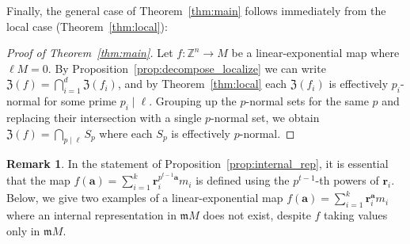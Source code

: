\documentclass[letterpaper, 11pt, thm-restate]{article}
\numberwithin{equation}{section}
\newcommand{\Z}{\mathbb{Z}}
\newcommand{\mZ}{\mathfrak{Z}}
\newcommand{\ba}{\boldsymbol{a}}
\newcommand{\br}{\boldsymbol{r}}
\newcommand{\frm}{\mathfrak{m}}
\theoremstyle{definition}
\theoremstyle{definition}
\theoremstyle{definition}
\newtheorem{remark}[theorem]{Remark}
\begin{document}
Finally, the general case of Theorem~\ref{thm:main} follows immediately from the local case (Theorem~\ref{thm:local}):

\begin{proof}[Proof of Theorem~\ref{thm:main}]
    Let $f \colon \Z^n \rightarrow M$ be a linear-exponential map where $\ell M = 0$.
    By Proposition~\ref{prop:decompose_localize} we can write $\mZ(f) = \bigcap_{i = 1}^d \mZ(f_i)$, and by Theorem~\ref{thm:local} each $\mZ(f_i)$ is effectively $p_i$-normal for some prime $p_i \mid \ell$.
    Grouping up the $p$-normal sets for the same $p$ and replacing their intersection with a single $p$-normal set, we obtain $\mZ(f) = \bigcap_{p \mid \ell} S_p$ where each $S_p$ is effectively $p$-normal.
\end{proof}

\begin{remark}\label{rmk:counterexample}
    In the statement of Proposition~\ref{prop:internal_rep}, it is essential that the map $f(\ba)=\sum_{i=1}^k \br_i^{p^{t-1}\ba}m_i$ is defined using the $p^{t-1}$-th powers of $\br_i$.
    Below, we give two examples of a linear-exponential map $f(\ba)=\sum_{i=1}^k \br_i^{\ba}m_i$ where an internal representation in $\frm M$ does not exist, despite $f$ taking values only in $\frm M$.


\end{remark}
\end{document}
